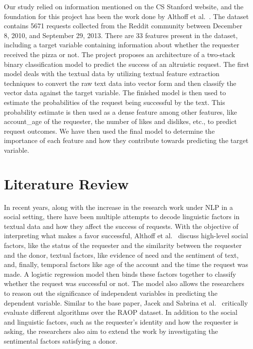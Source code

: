 \documentclass[runningheads]{llncs}
\begin{document}
Our study relied on information mentioned on the CS Stanford website, and the foundation for this project has been the work done by Althoff et al.~\cite{raop_base}. The dataset contains 5671 requests collected from the Reddit community between December 8, 2010, and September 29, 2013. There are 33 features present in the dataset, including a target variable containing information about whether the requester received the pizza or not. The project proposes an architecture of a two-stack binary classification model to predict the success of an altruistic request. The first model deals with the textual data by utilizing textual feature extraction techniques to convert the raw text data into vector form and then classify the vector data against the target variable. The finished model is then used to estimate the probabilities of the request being successful by the text. This probability estimate is then used as a dense feature among other features, like account\_age of the requester, the number of likes and dislikes, etc., to predict request outcomes. We have then used the final model to determine the importance of each feature and how they contribute towards predicting the target variable.

\section{Literature Review}
In recent years, along with the increase in the research work under NLP in a social setting, there have been multiple attempts to decode linguistic factors in textual data and how they affect the success of requests. With the objective of interpreting what makes a favor successful, Althoff et al.~\cite{raop_base} discuss high-level social factors, like the status of the requester and the similarity between the requester and the donor, textual factors, like evidence of need and the sentiment of text, and, finally, temporal factors like age of the account and the time the request was made. A logistic regression model then binds these factors together to classify whether the request was successful or not. The model also allows the researchers to reason out the significance of independent variables in predicting the dependent variable. Similar to the base paper, Jacek and Sabrina et al.~\cite{raop_sent} critically evaluate different algorithms over the RAOP dataset. In addition to the social and linguistic factors, such as the requester's identity and how the requester is asking, the researchers also aim to extend the work by investigating the sentimental factors satisfying a donor.
\end{document}
